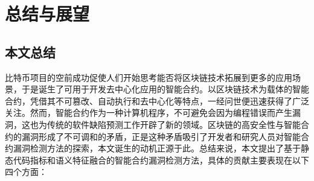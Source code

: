 \chapter{总结与展望}

\section{本文总结}
比特币项目的空前成功促使人们开始思考能否将区块链技术拓展到更多的应用场景，于是诞生了可用于开发去中心化应用的智能合约。以区块链技术为载体的智能合约，凭借其不可篡改、自动执行和去中心化等特点，一经问世便迅速获得了广泛关注。然而，智能合约作为一种计算机程序，不可避免会因为编程错误而产生漏洞，这也为传统的软件缺陷预测工作开辟了新的领域。区块链的高安全性与智能合约的漏洞形成了不可调和的矛盾，正是这种矛盾吸引了开发者和研究人员对智能合约漏洞检测方法的探索，本文诞生的动机正源于此。总结来说，本文提出了基于静态代码指标和语义特征融合的智能合约漏洞检测方法，具体的贡献主要表现在以下四个方面：
